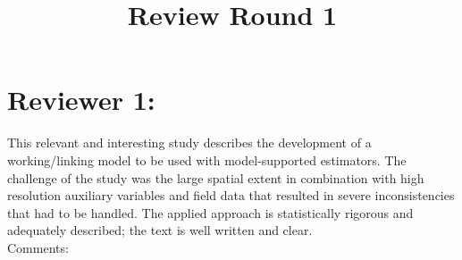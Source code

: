 \documentclass{article}
\title{Review Round 1\\\vspace{1cm}}
\author{}
\begin{document}

\maketitle
\thispagestyle{empty}
\newpage

\setcounter{page}{1}

\pagestyle{fancy} %
\fancyfoot[C]{\thepage}
\setlength{\headsep}{15mm}

\newcommand{\answer}[1]{\small \color{mybrown}{#1} \color{black}}
\newcommand{\note}[1]{\textit{\small \color{amaranth} \textbf{Note:} #1} \color{black}}



\section*{Reviewer 1:}

This relevant and interesting study describes the development of a working/linking model to be used with model-supported estimators. The challenge of the study was the large spatial extent in combination with high resolution auxiliary variables and field data that resulted in severe inconsistencies that had to be handled. The applied approach is statistically rigorous and adequately described; the text is well written and clear.\\

Comments:\\
\end{document}
